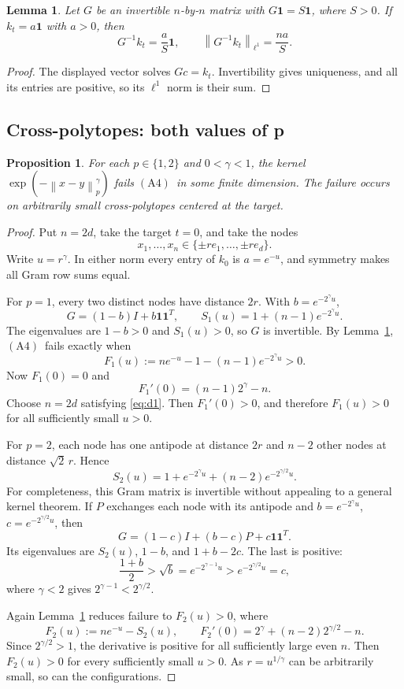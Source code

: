 \documentclass[11pt]{article}
\newtheorem{proposition}{Proposition}
\newtheorem{lemma}{Lemma}
\newcommand{\one}{\mathbf 1}
\newcommand{\norm}[1]{\left\lVert #1\right\rVert}
\newcommand{\Afour}{\ensuremath{\mathrm{(A4)}}}
\begin{document}
\begin{lemma}
\label{lem:symmetry}
Let $G$ be an invertible $n$-by-$n$ matrix with
$G\one=S\one$, where $S>0$.  If $k_t=a\one$ with $a>0$, then
\[
  G^{-1}k_t=\frac{a}{S}\one,
  \qquad
  \norm{G^{-1}k_t}_{\ell^1}=\frac{na}{S}.
\]
\end{lemma}
\begin{proof}
The displayed vector solves $Gc=k_t$.  Invertibility gives uniqueness, and
all its entries are positive, so its $\ell^1$ norm is their sum.
\end{proof}

\subsection{Cross-polytopes: both values of p}

\begin{proposition}
\label{prop:cross}
For each $p\in\{1,2\}$ and $0<\gamma<1$, the kernel
$\exp(-\norm{x-y}_p^\gamma)$ fails \Afour\ in some finite dimension.
The failure occurs on arbitrarily small cross-polytopes centered at the
target.
\end{proposition}

\begin{proof}
Put $n=2d$, take the target $t=0$, and take the nodes
\[
  x_1,\ldots,x_n\in\{\pm r e_1,\ldots,\pm r e_d\}.
\]
Write $u=r^\gamma$.  In either norm every entry of $k_0$ is
$a=e^{-u}$, and symmetry makes all Gram row sums equal.

For $p=1$, every two distinct nodes have distance $2r$.  With
$b=e^{-2^\gamma u}$,
\[
  G=(1-b)I+b\one\one^{T},\qquad
  S_1(u)=1+(n-1)e^{-2^\gamma u}.
\]
The eigenvalues are $1-b>0$ and $S_1(u)>0$, so $G$ is invertible.
By Lemma~\ref{lem:symmetry}, \Afour\ fails exactly when
\[
 F_1(u):=ne^{-u}-1-(n-1)e^{-2^\gamma u}>0.
\]
Now $F_1(0)=0$ and
\[
 F_1'(0)=(n-1)2^\gamma-n.
\]
Choose $n=2d$ satisfying \eqref{eq:d1}.  Then $F_1'(0)>0$, and therefore
$F_1(u)>0$ for all sufficiently small $u>0$.

For $p=2$, each node has one antipode at distance $2r$ and $n-2$ other
nodes at distance $\sqrt2\,r$.  Hence
\[
 S_2(u)=1+e^{-2^\gamma u}
          +(n-2)e^{-2^{\gamma/2}u}.
\]
For completeness, this Gram matrix is invertible without appealing to a
general kernel theorem.  If $P$ exchanges each node with its antipode and
$b=e^{-2^\gamma u}$, $c=e^{-2^{\gamma/2}u}$, then
\[
 G=(1-c)I+(b-c)P+c\one\one^T.
\]
Its eigenvalues are $S_2(u)$, $1-b$, and $1+b-2c$.  The last is positive:
\[
 \frac{1+b}{2}>\sqrt b
 =e^{-2^{\gamma-1}u}>e^{-2^{\gamma/2}u}=c,
\]
where $\gamma<2$ gives $2^{\gamma-1}<2^{\gamma/2}$.

Again Lemma~\ref{lem:symmetry} reduces failure to $F_2(u)>0$, where
\[
 F_2(u):=ne^{-u}-S_2(u),\qquad
 F_2'(0)=2^\gamma+(n-2)2^{\gamma/2}-n.
\]
Since $2^{\gamma/2}>1$, the derivative is positive for all sufficiently
large even $n$.  Then $F_2(u)>0$ for every sufficiently small $u>0$.
As $r=u^{1/\gamma}$ can be arbitrarily small, so can the configurations.
\end{proof}
\end{document}
